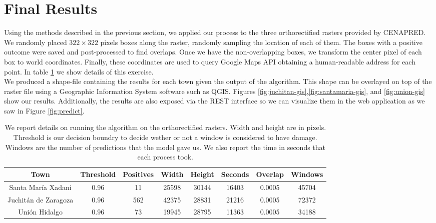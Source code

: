 \section{Final Results}

Using the methods described in the previous section, we applied our process to the three orthorectified rasters provided by CENAPRED. We randomly placed $322\times322$ pixels boxes along the raster, randomly sampling the location of each of them. The boxes with a positive outcome were saved and post-processed to find overlaps. Once we have the non-overlapping boxes, we transform the center pixel of each box to world coordinates. Finally, these coordinates are used to query Google Maps API obtaining a human-readable address for each point. In table \ref{table:results} we show details of this exercise.\\

We produced a shape-file containing the results for each town given the output of the algorithm. This shape can be overlayed on top of the raster file using a Geographic Information System software such as QGIS. Figures \ref{fig:juchitan-gis},\ref{fig:santamaria-gis}, and \ref{fig:union-gis} show our results. Additionally, the results are also exposed via the REST interface so we can visualize them in the web application as we saw in Figure \ref{fig:predict}.\\


\begin{table}[h!]
  \centering
  \begin{tabular}{|c|c|c|c|c|c|c|c|}
    \hline
    Town                 &Threshold&Positives  & Width & Height & Seconds & Overlap &Windows \\ \hline
    Santa Mar\'ia Xadani   &0.96      &11         & 25598 & 30144  & 16403   & 0.0005  &45704 \\ \hline
    Juchit\'an de Zaragoza &0.96      &562        & 42375 & 28831  & 21216   & 0.0005  &72372 \\ \hline
    Uni\'on Hidalgo        &0.96      &73         & 19945 & 28795  & 11363   & 0.0005  &34188 \\
    \hline
  \end{tabular}
  \caption{We report details on running the algorithm on the orthorectified rasters. Width and height are in pixels. Threshold is our decision boundry to decide wether or not a window is considered to have damage. Windows are the number of predictions that the model gave us. We also report the time in seconds that each process took.}
  \label{table:results}
\end{table}





